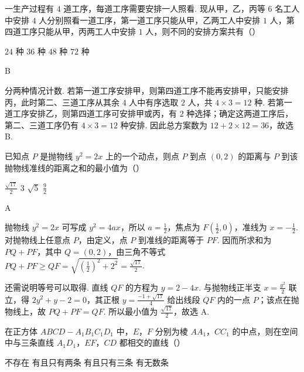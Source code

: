 \begin{problem}
一生产过程有 \(4\text{ 道}\)工序，每道工序需要安排一人照看. 现从甲，乙，丙等 \(6\text{ 名}\)工人中安排 \(4\text{ 人}\)分别照看一道工序，第一道工序只能从甲，乙两工人中安排 \(1\text{ 人}\)，第四道工序只能从甲，丙两工人中安排 \(1\text{ 人}\)，则不同的安排方案共有（\quad）

\choices
    {\(24\text{ 种}\)}
    {\(36\text{ 种}\)}
    {\(48\text{ 种}\)}
    {\(72\text{ 种}\)}
\end{problem}

\begin{answer}
B
\end{answer}

\begin{solution}
分两种情况计数. 若第一道工序安排甲，则第四道工序不能再安排甲，只能安排丙，此时第二、三道工序从其余 \(4\) 人中有序选取 \(2\) 人，共 \(4\times3=12\) 种. 若第一道工序安排乙，则第四道工序可安排甲或丙，有 \(2\) 种选择；确定这两道工序后，第二、三道工序仍有 \(4\times3=12\) 种安排. 因此总方案数为 \(12+2\times12=36\)，故选 B.
\end{solution}

\begin{problem}
已知点 \(P\) 是抛物线 \(y^{2} = 2x\) 上的一个动点，则点 \(P\) 到点 \((0, 2)\) 的距离与 \(P\) 到该抛物线准线的距离之和的最小值为（\quad）

\choices
    {\(\frac{\sqrt{17}}{2}\)}
    {3}
    {\(\sqrt{5}\)}
    {\(\frac{9}{2}\)}
\end{problem}

\begin{answer}
A
\end{answer}

\begin{solution}
抛物线 \(y^2=2x\) 可写成 \(y^2=4ax\)，所以 \(a=\frac{1}{2}\)，焦点为 \(F(\frac{1}{2},0)\)，准线为 \(x=-\frac{1}{2}\). 对抛物线上任意点 \(P\)，由定义，点 \(P\) 到准线的距离等于 \(PF\). 因而所求和为 \(PQ+PF\)，其中 \(Q=(0,2)\)，由三角不等式
\(PQ+PF\geqslant QF=\sqrt{\left(\frac{1}{2}\right)^2+2^2}=\frac{\sqrt{17}}{2}\).

还需说明等号可以取得. 直线 \(QF\) 的方程为 \(y=2-4x\). 与抛物线正半支 \(x=\frac{y^2}{2}\) 联立，得 \(2y^2+y-2=0\)，其正根 \(y=\frac{-1+\sqrt{17}}{4}\) 给出线段 \(QF\) 内的一点 \(P\)；该点在抛物线上，故 \(PQ+PF=QF\). 所以最小值为 \(\frac{\sqrt{17}}{2}\)，故选 A.
\end{solution}

\begin{problem}
在正方体 \(ABCD - A_{1}B_{1}C_{1}D_{1}\) 中，\(E\)，\(F\) 分别为棱 \(AA_{1}\)，\(CC_{1}\) 的中点，则在空间中与三条直线 \(A_{1}D_{1}\)，\(EF\)，\(CD\) 都相交的直线（\quad）

\choices
    {不存在}
    {有且只有两条}
    {有且只有三条}
    {有无数条}
\end{problem}


